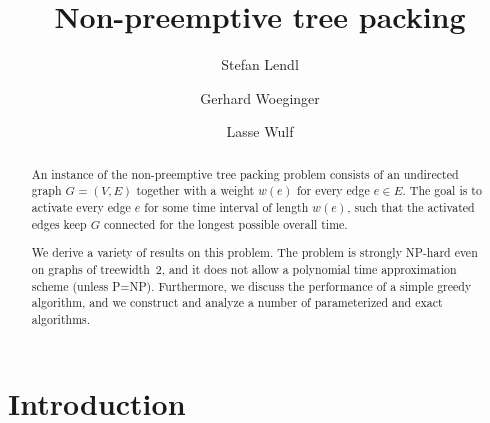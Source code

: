 \documentclass[runningheads]{llncs}
\begin{document}
\title{Non-preemptive tree packing}

\author{Stefan Lendl \and
Gerhard Woeginger \and
Lasse Wulf}

%
\maketitle 

\begin{abstract}
An instance of the non-preemptive tree packing problem consists of an undirected graph $G=(V,E)$ 
together with a weight $w(e)$ for every edge $e\in E$.
The goal is to activate every edge $e$ for some time interval of length $w(e)$, such that the 
activated edges keep $G$ connected for the longest possible overall time.

We derive a variety of results on this problem.
The problem is strongly NP-hard even on graphs of treewidth~$2$, and it does not allow a polynomial
time approximation scheme (unless P=NP).
Furthermore, we discuss the performance of a simple greedy algorithm, and we construct and analyze
a number of parameterized and exact algorithms.
\end{abstract}


\section{Introduction}
\end{document}
